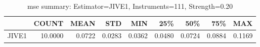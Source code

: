 \begin{table}[ht]
\centering
\caption{mse summary: Estimator=JIVE1, Instruments=111, Strength=0.20}
\begin{tabular}{lrrrrrrrr}
\toprule
 & COUNT & MEAN & STD & MIN & 25\% & 50\% & 75\% & MAX \\
\midrule
JIVE1 & 10.0000 & 0.0722 & 0.0283 & 0.0362 & 0.0480 & 0.0724 & 0.0884 & 0.1169 \\
\bottomrule
\end{tabular}
\end{table}
